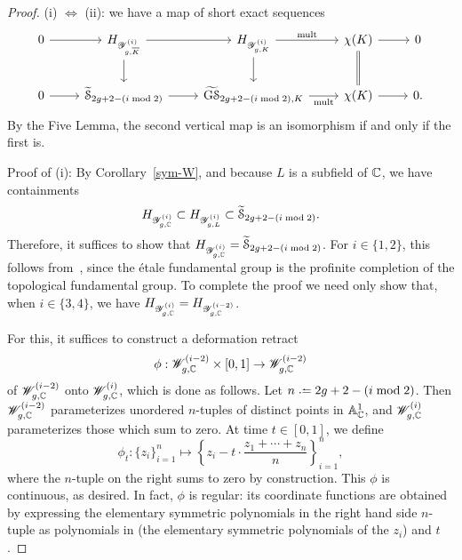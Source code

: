 \begin{proof}
(i) $\Leftrightarrow$ (ii): we have a map of short exact sequences 
\begin{equation}
	\label{equation:}
	\begin{tikzcd}
		0 \ar {r}  &  \mono_{\standardFamily g i {\overline K}} \ar {r}\ar{d} & \mono_{\standardFamily g i K} \ar {r}{\mult}\ar{d} & \chi(K) \ar {r}\ar[equal]{d} & 0 \\
			0 \ar {r} &  \hyphat_{2g+2-(i \bmod 2)} \ar {r} & \grouphypboth g {(i \bmod 2)} K \ar[swap]{r}{\mult} & \chi(K) \ar {r} & 0.
	\end{tikzcd}\end{equation}
By the Five Lemma, the second vertical map is an isomorphism if and only if the first is.

Proof of (i): By Corollary~\ref{sym-W}, and because $L$ is a subfield of $\bc$, we have containments
\[
H_{\standardFamily g i \bc} \subset H_{\standardFamily g i L} \subset \hyphat_{2g+2-(i \bmod 2)}. 
\]
Therefore, it suffices to show that $H_{\standardFamily g i \bc} = \hyphat_{2g+2-(i \bmod 2)}$. For $i \in \{1, 2\}$, this follows from~\cite[Th\'eor\`eme 1]{acampo:tresses-monodromie-et-le-groupe-symplectique}, since the \'etale fundamental group is the profinite completion of the topological fundamental group. To complete the proof we need only show that, when $i \in \{3, 4\}$, we have $\mono_{\standardFamily g i {\mathbb C}} = \mono_{\standardFamily g {i-2} {\mathbb C}}$. 

For this, it suffices to construct a deformation retract 
\[
	\phi: \standardTarget g {i-2} {\mathbb C} \times [0, 1] \to \standardTarget g {i-2} {\mathbb C}
\]
of $\standardTarget g {i-2} {\mathbb C}$ onto $\standardTarget g i {\mathbb C}$, which is done as follows. Let $n \defeq 2g+2-(i \bmod 2)$. Then $\standardTarget g {i-2} {\mathbb C}$ parameterizes unordered $n$-tuples of distinct points in $\ba^1_\bc$, and $\standardTarget g i {\mathbb C}$ parameterizes those which sum to zero. At time $t \in [0, 1]$, we define 
\[
\phi_t \colon \{z_i\}_{i=1}^n \mapsto \left\{z_i - t \cdot \frac{z_1 + \cdots + z_n}{n}\right\}_{i=1}^n, 
\]
where the $n$-tuple on the right sums to zero by construction. This $\phi$ is continuous, as desired. In fact, $\phi$ is regular: its coordinate functions are obtained by expressing the elementary symmetric polynomials in the right hand side $n$-tuple as polynomials in (the elementary symmetric polynomials of the $z_i$) and $t$. 
\end{proof}

